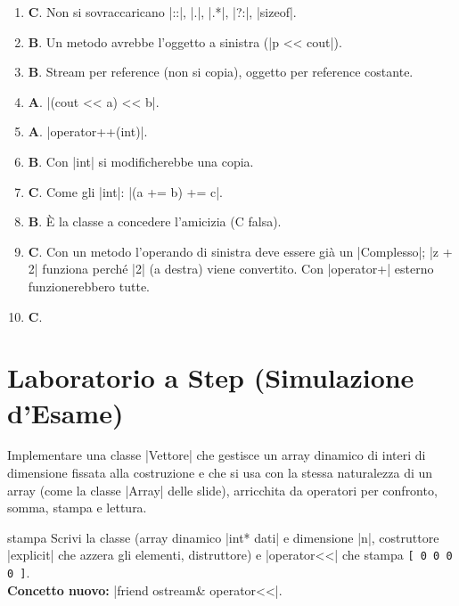 \begin{soluzione}
\begin{enumerate}[label=\textbf{\arabic*.}]
  \item \textbf{C}. Non si sovraccaricano \cc|::|, \cc|.|, \cc|.*|, \cc|?:|, \cc|sizeof|.
  \item \textbf{B}. Un metodo avrebbe l'oggetto a sinistra (\cc|p << cout|).
  \item \textbf{B}. Stream per reference (non si copia), oggetto per reference costante.
  \item \textbf{A}. \cc|(cout << a) << b|.
  \item \textbf{A}. \cc|operator++(int)|.
  \item \textbf{B}. Con \cc|int| si modificherebbe una copia.
  \item \textbf{C}. Come gli \cc|int|: \cc|(a += b) += c|.
  \item \textbf{B}. È la classe a concedere l'amicizia (C falsa).
  \item \textbf{C}. Con un metodo l'operando di sinistra deve essere già un
        \cc|Complesso|; \cc|z + 2| funziona perché \cc|2| (a destra) viene convertito.
        Con \cc|operator+| esterno funzionerebbero tutte.
  \item \textbf{C}.
\end{enumerate}
\end{soluzione}

\section{Laboratorio a Step (Simulazione d'Esame)}

\begin{traccia}
Implementare una classe \cc|Vettore| che gestisce un array dinamico di interi di
dimensione fissata alla costruzione e che si usa con la stessa naturalezza di un array
(come la classe \cc|Array| delle slide), arricchita da operatori per confronto, somma,
stampa e lettura.
\end{traccia}

\begin{step}{stampa}
Scrivi la classe (array dinamico \cc|int* dati| e dimensione \cc|n|, costruttore
\cc|explicit| che azzera gli elementi, distruttore) e \cc|operator<<| che stampa
\texttt{[ 0 0 0 0 ]}.\\[0.3em]
\textbf{Concetto nuovo:} \cc|friend ostream& operator<<|.
\end{step}

